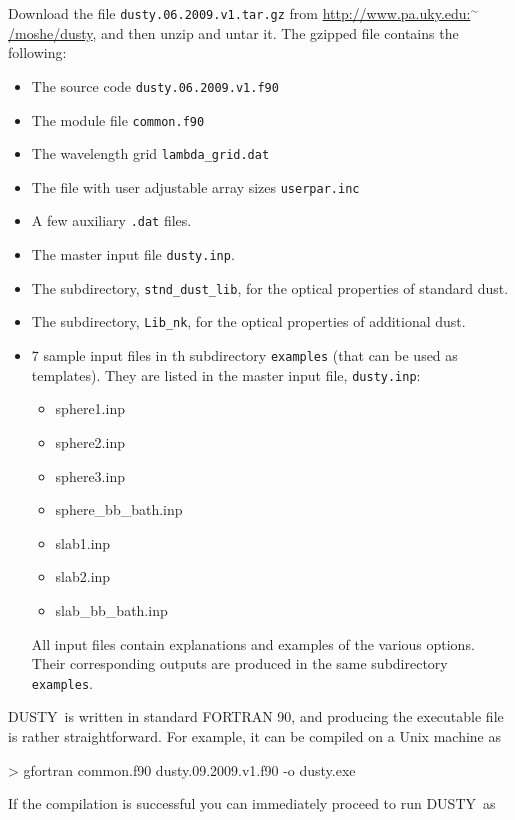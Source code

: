 \documentclass[11pt]{article}
\def\D  {{\sf DUSTY}}
\begin{document}
Download the file {\tt dusty.06.2009.v1.tar.gz} from 
\href{http://www.pa.uky.edu:~/moshe/dusty}
{http://www.pa.uky.edu:$^\sim$/moshe/dusty}, and then unzip and untar it.
The gzipped file contains the following:
%
\begin{itemize}
%
\item
  The source code {\tt dusty.06.2009.v1.f90}
%
\item The module file {\tt common.f90}
%
\item
  The wavelength grid {\tt lambda\_grid.dat}
%
\item
  The file with user adjustable array sizes  {\tt userpar.inc}
%
\item
  A few auxiliary {\tt \*.dat} files.
%
\item
  The master input file {\tt dusty.inp}.
%
\item
  The subdirectory, {\tt stnd\_dust\_lib}, for the optical properties of standard dust.
%
\item 
  The subdirectory, {\tt Lib\_nk}, for the optical properties of additional dust.
%
\item
7 sample input files in th subdirectory {\tt examples} (that can be used as templates). 
They are listed in the master input file, {\tt dusty.inp}:
%
\begin{itemize}
%
\item
  sphere1.inp
%
\item
  sphere2.inp
%
\item
  sphere3.inp
%
\item
  sphere\_bb\_bath.inp
% 
\item
  slab1.inp
% 
\item
  slab2.inp
%
\item
  slab\_bb\_bath.inp
\end{itemize}

All input files contain explanations and examples of the various options. Their 
corresponding outputs are produced in the same subdirectory {\tt examples}.
\end{itemize} 
 
\D\ is written in standard FORTRAN 90, and producing the executable file  
is rather straightforward.  For example, it can be compiled on a Unix machine as

\bigskip

{\tt

> gfortran common.f90 dusty.09.2009.v1.f90 -o dusty.exe
}

\bigskip\noindent If the compilation is successful you can immediately proceed
to run \D\ as
\end{document}
